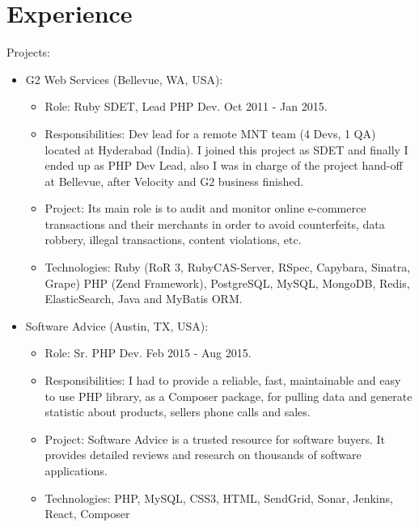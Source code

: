 \documentclass[11pt,a4paper,sans]{moderncv}        %
\begin{document}
\section{Experience}
  {
    Projects:\\
    \begin{itemize}
      \item G2 Web Services (Bellevue, WA, USA):
        \begin{itemize}
          \item Role: Ruby SDET, Lead PHP Dev. Oct 2011 - Jan 2015.
          \item Responsibilities: Dev lead for a remote MNT team (4 Devs, 1 QA) located at Hyderabad (India). I joined this project as SDET and finally I ended up as PHP Dev Lead, also I was in charge of the project hand-off at Bellevue, after Velocity and G2 business finished.
          \item Project: Its main role is to audit and monitor online e-commerce transactions and their merchants in order to avoid counterfeits, data robbery, illegal transactions, content violations, etc.
          \item Technologies: Ruby (RoR 3, RubyCAS-Server, RSpec, Capybara, Sinatra, Grape) PHP (Zend Framework), PostgreSQL, MySQL, MongoDB, Redis, ElasticSearch, Java and MyBatis ORM.
        \end{itemize}
      \item Software Advice (Austin, TX, USA):
       \begin{itemize}
          \item Role: Sr. PHP Dev. Feb 2015 - Aug 2015.
          \item Responsibilities: I had to provide a reliable, fast, maintainable and easy to use PHP library, as a Composer package, for pulling data and generate statistic about products, sellers phone calls and sales.
          \item Project: Software Advice is a trusted resource for software buyers. It provides detailed reviews and research on thousands of software applications.
          \item Technologies: PHP, MySQL, CSS3, HTML, SendGrid, Sonar, Jenkins, React, Composer

\end{itemize}
\end{itemize}}
\end{document}
